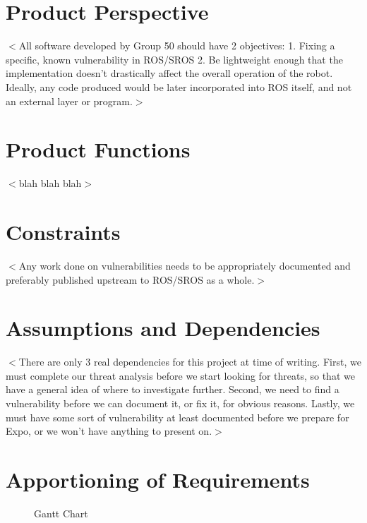\documentclass{scrreprt}
\begin{document}
\section{Product Perspective}
$<$All software developed by Group 50 should have 2 objectives:
1. Fixing a specific, known vulnerability in ROS/SROS
2. Be lightweight enough that the implementation doesn't drastically affect the overall operation of the robot. Ideally, any code produced would be later incorporated into ROS itself, and not an external layer or program.$>$

\section{Product Functions}
$<$blah blah blah$>$

\section{Constraints}
$<$Any work done on vulnerabilities needs to be appropriately documented and preferably published upstream to ROS/SROS as a whole.$>$

\section{Assumptions and Dependencies}
$<$There are only 3 real dependencies for this project at time of writing. First, we must complete our threat analysis before we start looking for threats,
so that we have a general idea of where to investigate further. Second, we need to find a vulnerability before we can document it, or fix it, for obvious reasons.
Lastly, we must have some sort of vulnerability at least documented before we prepare for Expo, or we won't have anything to present on.$>$

\section{Apportioning of Requirements}
  \begin{center}
    \begin{figure}
      \caption{Gantt Chart}
      \label{fig:gantt}
    \end{figure}
  \end{center}
\end{document}
